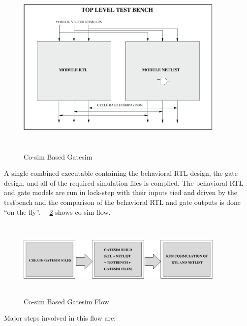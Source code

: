 \begin{figure}[h!]
\centering
\includegraphics[width=4in, height=3.5in]{./figures/cosim.ps}
\caption{Co-sim Based Gatesim}
\label{fig:cosim.ps}
\end{figure}


 A single combined executable containing the behavioral RTL design, the gate design, and all of the required simulation files is compiled. The behavioral RTL and gate models are run in lock-step with their inputs tied and driven by the testbench and the comparison of the behavioral RTL and gate outputs is done ``on the fly''. ~\figurename{~\ref{fig:cosim_flow.eps}} shows co-sim flow.




\begin{figure}[H]
\centering
\includegraphics[width=4in, height=1.5in]{./figures/cosim_flow.eps}
\caption{Co-sim Based Gatesim Flow}
\label{fig:cosim_flow.eps}
\end{figure}

Major steps involved in this flow are:


